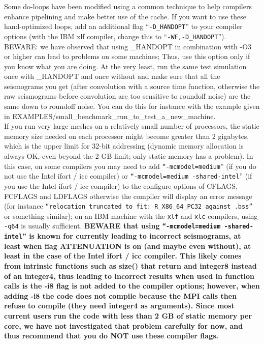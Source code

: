 \documentclass[oneside,english]{book}
\begin{document}
Some do-loops have been modified using a common technique to help compilers enhance pipelining and make better use
of the cache. If you want to use these hand-optimized loops, add an additional flag ``\texttt{-D\_HANDOPT}'' to your compiler options
(with the IBM xlf compiler, change this to ``\texttt{-WF,-D\_HANDOPT}'').
BEWARE: we have observed that using \_HANDOPT in combination with -O3 or higher can lead to problems on some machines;
Thus, use this option only if you know what you are doing.
At the very least, run the same test simulation once with \_HANDOPT and once without
and make sure that all the seismograms you get (after convolution with a source time function, otherwise the raw seismograms before
convolution are too sensitive to roundoff noise) are the same down to roundoff noise.
You can do this for instance with the example given in EXAMPLES/small\_benchmark\_run\_to\_test\_a\_new\_machine.\\

If you run very large meshes on a relatively small number
of processors, the static memory size needed on each processor might become
greater than 2 gigabytes, which is the upper limit for 32-bit addressing
(dynamic memory allocation is always OK, even beyond the 2 GB limit; only static memory has a problem).
In this case, on some compilers you may need to add \texttt{``-mcmodel=medium}'' (if you do not use the Intel ifort / icc compiler)
or \texttt{``-mcmodel=medium -shared-intel}'' (if you use the Intel ifort / icc compiler)
to the configure options of CFLAGS, FCFLAGS and LDFLAGS otherwise the compiler will display an error
message (for instance \texttt{``relocation truncated to fit: R\_X86\_64\_PC32 against .bss''} or something similar);
on an IBM machine with the \texttt{xlf} and \texttt{xlc} compilers, using \texttt{-q64} is usually sufficient.
\textbf{BEWARE that using \texttt{``-mcmodel=medium -shared-intel}'' is known for currently leading to incorrect seismograms,
at least when flag ATTENUATION is on (and maybe even without), at least in the case of the Intel ifort / icc compiler.
This likely comes from intrinsic functions such as size() that return and integer8 instead of an integer4, thus leading
to incorrect results when used in function calls is the -i8 flag is not added to the compiler options;
however, when adding -i8 the code does not compile because the MPI calls then refuse to compile (they need integer4 as arguments).
Since most current users run the code with less than 2 GB of static memory per core, we have not investigated that problem carefully for now,
and thus recommend that you do NOT use these compiler flags.}\\
\end{document}
